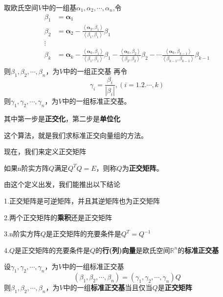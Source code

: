 \documentclass[lang=cn,10pt]{elegantbook}
\begin{document}
	\begin{theorem}[Schimit正交化]
		取欧氏空间$V$中的一组基$\alpha_{1},\alpha_{2},\cdots,\alpha_{n}$,令
		\begin{equation*}
			\begin{aligned}
				\beta _1&=\boldsymbol{\alpha }_1\\
				\beta _2&=\boldsymbol{\alpha }_2-\frac{\left< \boldsymbol{\alpha }_2,\beta _1 \right>}{\left< \beta _1,\beta _1 \right>}\beta _1\\
				\vdots\\
				\beta _k&=\boldsymbol{\alpha }_k-\frac{\left< \boldsymbol{\alpha }_k,\beta _1 \right>}{\left< \beta _1,\beta _1 \right>}\beta _1-\frac{\left< \boldsymbol{\alpha }_k,\beta _2 \right>}{\left< \beta _2,\beta _2 \right>}\beta _2-\cdots \frac{\left< \boldsymbol{\alpha }_k,\beta _{k-1} \right>}{\left< \beta _{k-1},\beta _{k-1} \right>}\beta _{k-1}\\
			\end{aligned}
		\end{equation*}
		则$\beta_{1},\beta_{2},\cdots,\beta_{n}$，为$V$中的一组正交基
		再令
		\begin{equation*}
			\gamma_{i}=\frac{\beta_{i}}{|\beta_{i}|},(i=1.2.\cdots,k)
		\end{equation*}
		则$\gamma_{1},\gamma_{2},\cdots,\gamma_{n}$，为$V$中的一组标准正交基。
		
		其中第一步是\textbf{正交化}，第二步是\textbf{单位化}
	\end{theorem}
	这个算法，就是我们求标准正交向量组的方法。
	
	现在，我们来定义正交矩阵
	
	\begin{definition}
		如果n阶实方阵$Q$满足$Q^{T}Q=E$，则称$Q$为\textbf{正交矩阵}。
	\end{definition}
	
	由这个定义出发，我们能推出以下结论
	\begin{conclusion}
		1.正交矩阵是可逆矩阵，并且其逆矩阵也为正交矩阵
		
		2.两个正交矩阵的\textbf{乘积}还是正交矩阵
		
		3.n阶实方阵$Q$是正交矩阵的充要条件是$Q^{T}=Q^{-1}$
		
		4.$Q$是正交矩阵的充要条件是$Q$的\textbf{行(列)向量}是欧氏空间$\mathbb{R} ^n$的\textbf{标准正交基}
		
		
	\end{conclusion}
	\begin{conclusion}
		设$\gamma_{1},\gamma_{2},\cdots,\gamma_{n}$，为$V$中的一组标准正交基
		\begin{equation*}
			(\beta_{1},\beta_{2},\cdots,\beta_{n})=(\gamma_{1},\gamma_{2},\cdots,\gamma_{n})Q
		\end{equation*}
		则$\beta_{1},\beta_{2},\cdots,\beta_{n}$，为$V$中的一组\textbf{标准正交基}当且仅当$Q$是\textbf{正交矩阵}
	\end{conclusion}
	
\end{document}
